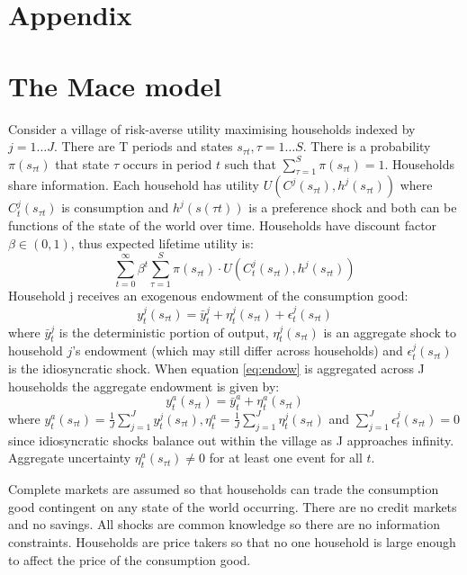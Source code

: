 \newpage
\section{Appendix}
\appendix
\section{The Mace model} \label{append mace}
Consider a village of risk-averse utility maximising households indexed by $j=1 \ldots J$. There are T periods and states $s_{\tau t}, \tau=1 \ldots S$. There is a probability $\pi(s_{\tau t})$ that state $\tau$ occurs in period $t$ such that $\sum_{\tau=1}^{S} \pi(s_{\tau t})=1$. Households share information. Each household has utility $U(C^j(s_{\tau t}),h^j(s_{\tau t}))$ where $C^j_t(s_{\tau t})$ is consumption and $h^j(s(\tau t))$ is a preference shock and both can be functions of the state of the world over time. Households have discount factor $\beta \in (0,1)$, thus expected lifetime utility is: 
\begin{equation} \label{utility}
\sum_{t=0}^{\infty} \beta^t \sum_{\tau=1}^{S}\pi(s_{\tau t})\cdot U(C^j_t(s_{\tau t}),h^j(s_{\tau t}))
\end{equation}
Household j receives an exogenous endowment of the consumption good: 
\begin{equation} \label{eq:endow}
y^j_t(s_{\tau t}) = \bar{y}^j_t + \eta_t^j(s_{\tau t}) + \epsilon_t^j(s_{\tau t})
\end{equation}
where $\bar{y}^j_t$ is the deterministic portion of output, $\eta_t^j(s_{\tau t})$ is an aggregate shock to household $j$'s endowment (which may still differ across households) and $\epsilon_t^j(s_{\tau t})$ is the idiosyncratic shock. When equation \eqref{eq:endow} is aggregated across J households the aggregate endowment is given by:
\begin{equation} \label{eq:agg endow}
y^a_t(s_{\tau t}) = \bar{y}^a_t + \eta_t^a(s_{\tau t})
\end{equation}
where $y^a_t(s_{\tau t})= \frac{1}{J}\sum_{j=1}^J y^j_t(s_{\tau t}), \eta^a_t=\frac{1}{J}\sum_{j=1}^J\eta_t^j(s_{\tau t})$ and $\sum_{j=1}^J \epsilon_t^j(s_{\tau t})=0$ since idiosyncratic shocks balance out within the village as J approaches infinity. Aggregate uncertainty $\eta_t^a(s_{\tau t}) \neq 0$ for at least one event for all $t$.  

Complete markets are assumed so that households can trade the consumption good contingent on any state of the world occurring. There are no credit markets and no savings. All shocks are common knowledge so there are no information constraints. Households are price takers so that no one household is large enough to affect the price of the consumption good.

